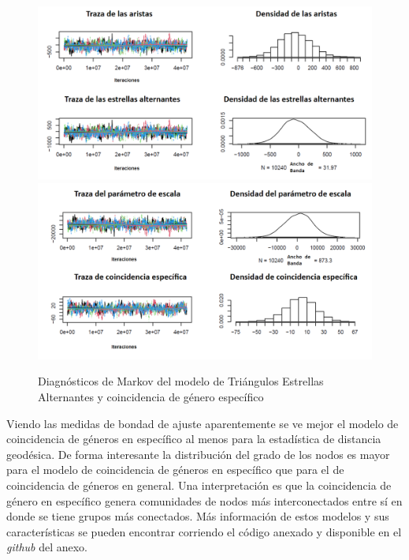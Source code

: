 \begin{figure}[!ht]
\includegraphics[width=1\textwidth]{Tesis/Figures/mcmc_specific1.PNG}
\includegraphics[width=1\textwidth]{Tesis/Figures/mcmc_specific2.PNG}
\caption{Diagnósticos de Markov del modelo de Triángulos Estrellas Alternantes y coincidencia de género específico}
\end{figure}

Viendo las medidas de bondad de ajuste aparentemente se ve mejor el modelo de coincidencia de géneros en específico al menos para la estadística de distancia geodésica. De forma interesante la distribución del grado de los nodos es mayor para el modelo de coincidencia de géneros en específico que para el de coincidencia de géneros en general. Una interpretación es que la coincidencia de género en específico genera comunidades de nodos más interconectados entre sí en donde se tiene grupos más conectados. Más información de estos modelos y sus características se pueden encontrar corriendo el código anexado y disponible en el \textit{github} del anexo.





